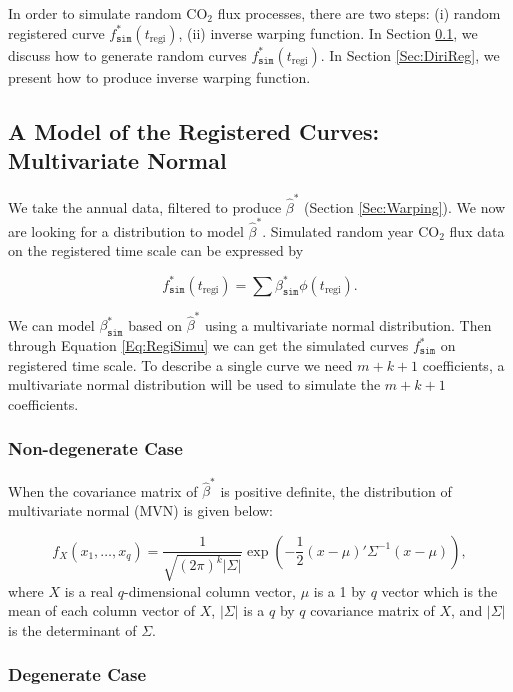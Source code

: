 \documentclass{article}\usepackage[]{graphicx}\usepackage[]{color}
\begin{document}
In order to simulate random CO$_2$ flux processes, there are two steps: (i) random registered curve $f^{*}_{\texttt{sim}}(t_{\textrm{regi}})$, (ii) inverse warping function. In Section \ref{Sec:MultiNormal}, we discuss how to generate random curves $f^{*}_{\texttt{sim}}(t_{\textrm{regi}})$. In Section \ref{Sec:DiriReg}, we present how to produce inverse warping function.


\subsection{A Model of the Registered Curves: Multivariate Normal}\label{Sec:MultiNormal}

We take the annual data, filtered to produce $\widehat{\beta}^{*}$ (Section \ref{Sec:Warping}). We now are looking for a distribution to model $\widehat{\beta}^{*}$. Simulated random year CO$_2$ flux data on the registered time scale can be expressed by

\begin{equation}
f^{*}_{\texttt{sim}}(t_{\textrm{regi}}) = \sum\beta^{*}_{\texttt{sim}}\phi(t_{\textrm{regi}}).\label{Eq:RegiSimu}
\end{equation}

We can model $\beta^{*}_{\texttt{sim}}$ based on $\widehat{\beta}^{*}$ using a multivariate normal distribution. Then through Equation \ref{Eq:RegiSimu} we can get the simulated curves $f^{*}_{\texttt{sim}}$ on registered time scale. 
To describe a single curve we need $m+k+1$ coefficients, a multivariate normal distribution will be used to simulate the $m+k+1$ coefficients. 

\subsubsection{Non-degenerate Case}

When the covariance matrix of $\widehat{\beta}^{*}$ is positive definite,  the distribution of multivariate normal (MVN) is given below:

\begin{equation}
f_X(x_1,\dots,x_{q}) = \frac{1}{\sqrt{(2\pi)^k|\Sigma|}}\exp\left(-\frac{1}{2}(x-\mu)'\Sigma^{-1}(x-\mu)\right),
\end{equation}
where $X$ is a real $q$-dimensional column vector, $\mu$ is a 1 by $q$ vector which is the mean of each column vector of $X$, $|\Sigma|$ is a $q$ by $q$ covariance matrix of $X$,  and $|\Sigma|$ is the determinant of $\Sigma$. 

\subsubsection{Degenerate Case}
\end{document}
